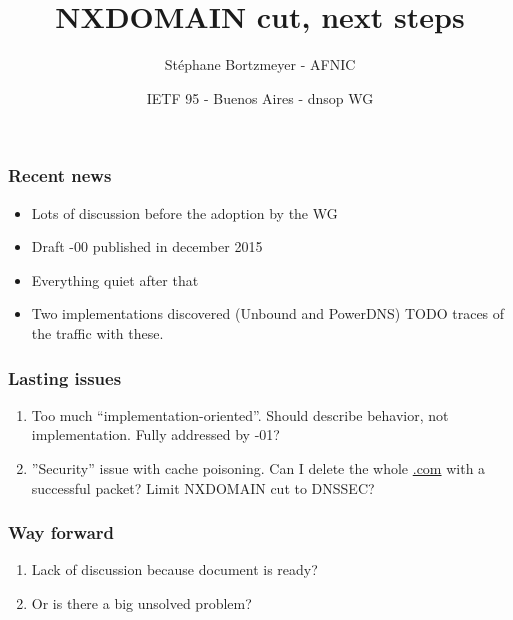 \documentclass[ignorenonframetext]{beamer}
\title{NXDOMAIN cut, next steps}
\author{Stéphane Bortzmeyer - AFNIC}
\date{IETF 95 - Buenos Aires - dnsop WG}
\begin{document}
\begin{frame}
\maketitle  
\end{frame}

\begin{frame}
  \frametitle{Recent news}
  \begin{itemize}
  \item<2->Lots of discussion before the adoption by the WG
  \item<3->Draft -00 published in december 2015
  \item<4->Everything quiet after that
  \item<5->Two implementations discovered (Unbound and PowerDNS) TODO
    traces of the traffic with these.
  \end{itemize}
\end{frame}

\begin{frame}
  \frametitle{Lasting issues}
  \begin{enumerate}
  \item<2->Too much ``implementation-oriented''. Should describe
    behavior, not implementation. Fully addressed by -01? 
  \item<3->''Security'' issue with cache poisoning. Can I delete
    the whole \url{.com} with a successful packet? Limit NXDOMAIN cut to
    DNSSEC?
  \end{enumerate}
\end{frame}

\begin{frame}
  \frametitle{Way forward}
  \begin{enumerate}
  \item<2->Lack of discussion because document is ready?
  \item<3->Or is there a big unsolved problem?
  \end{enumerate}
\end{frame}
\end{document}
